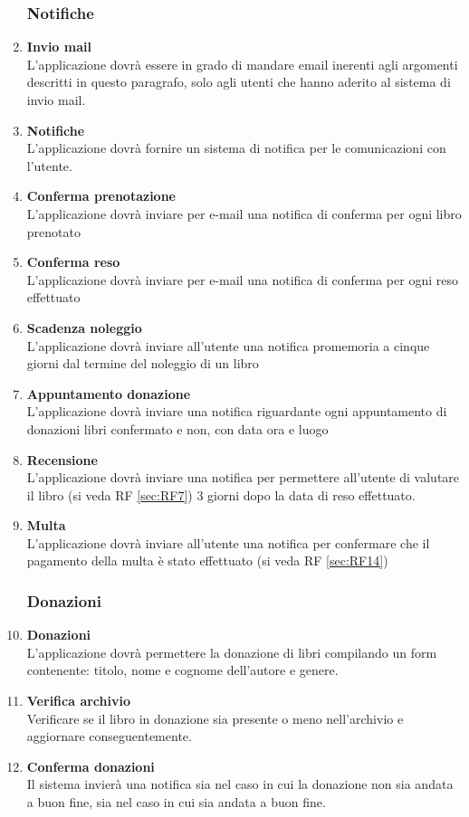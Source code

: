 \documentclass{article}
\begin{document}
\begin{enumerate}
    \subsubsection{Notifiche}
        \item \textbf{Invio mail}\label{sec:RF18}\\
        L’applicazione dovrà essere in grado di mandare email inerenti agli argomenti descritti in questo paragrafo, solo agli utenti che hanno aderito al sistema di invio mail.
        \item \textbf{Notifiche}\label{sec:RF19}\\
        L’applicazione dovrà fornire un sistema di notifica per le comunicazioni con l’utente.
        \item \textbf{Conferma prenotazione}\label{sec:RF20}\\
        L’applicazione dovrà inviare per e-mail una notifica di conferma per ogni libro prenotato
        \item \textbf{Conferma reso}\label{sec:RF21}\\
        L’applicazione dovrà inviare per e-mail una notifica di conferma per ogni reso effettuato
        \item \textbf{Scadenza noleggio}\label{sec:RF22}\\
        L’applicazione dovrà inviare all’utente una notifica promemoria a cinque giorni dal termine del noleggio di un libro
        \item \textbf{Appuntamento donazione}\label{sec:RF23}\\
        L’applicazione dovrà inviare una notifica riguardante ogni appuntamento di donazioni libri confermato e non, con data ora e luogo
        \item \textbf{ Recensione}\label{sec:RF24}\\
        L’applicazione dovrà inviare una notifica per permettere all’utente di valutare il libro (si veda RF \ref{sec:RF7}) 3 giorni dopo la data di reso effettuato.
        \item \textbf{ Multa}\\
        L'applicazione dovrà inviare all'utente una notifica per confermare che il pagamento della multa è stato effettuato (si veda RF \ref{sec:RF14})

    \subsubsection{Donazioni}
        \item \textbf{Donazioni}\label{sec:RF25}\\
        L’applicazione dovrà permettere la donazione di libri compilando un form contenente: titolo, nome e cognome dell'autore e genere.
        \item \textbf{Verifica archivio}\label{sec:RF26}\\
        Verificare se il libro in donazione sia presente o meno nell'archivio e aggiornare conseguentemente.
        \item \textbf{Conferma donazioni}\label{sec:RF27}\\
        Il sistema invierà una notifica sia nel caso in cui la donazione non sia andata a buon fine, sia nel caso in cui sia andata a buon fine.

\end{enumerate}
\end{document}
